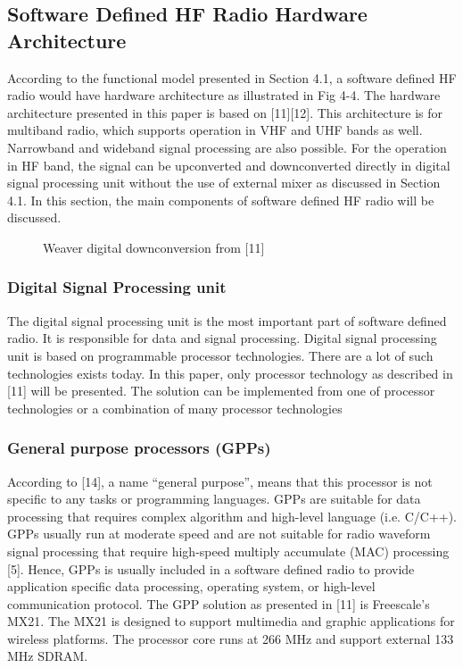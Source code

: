 \documentclass[conference]{IEEEtran}
\begin{document}
\subsection{Software Defined HF Radio Hardware Architecture }
According to the functional model presented in Section 4.1, a software defined HF radio would have hardware architecture as illustrated in Fig 4-4. The hardware architecture presented in this paper is based on [11][12]. This architecture is for multiband radio, which supports operation in VHF and UHF bands as well. Narrowband and wideband signal processing are also possible. For the operation in HF band, the signal can be upconverted and downconverted directly in digital signal processing unit without the use of external mixer as discussed in Section 4.1. In this section, the main components of software defined HF radio will be discussed.
\begin{figure}[h!]
	\centering
	\caption{Weaver digital downconversion from [11]}
\end{figure} 
\subsubsection{Digital Signal Processing unit}
The digital signal processing unit is the most important part of software defined radio. It is responsible for data and signal processing. Digital signal processing unit is based on programmable processor technologies. There are a lot of such technologies exists today. In this paper, only processor technology as described in [11] will be presented. The solution can be implemented from one of processor technologies or a combination of many processor technologies 
\subsubsection{General purpose processors (GPPs)}
According to [14], a name “general purpose”, means that this processor is not specific to any tasks or programming languages. GPPs are suitable for data processing that requires complex algorithm and high-level language (i.e. C/C++). GPPs usually run at moderate speed and are not suitable for radio waveform signal processing that require high-speed multiply accumulate (MAC) processing [5]. Hence, GPPs is usually included in a software defined radio to provide application specific data processing, operating system, or high-level communication protocol.
The GPP solution as presented in [11] is Freescale’s MX21. The MX21 is designed to support multimedia and graphic applications for wireless platforms. The processor core runs at 266 MHz and support external 133 MHz SDRAM. 
\end{document}

